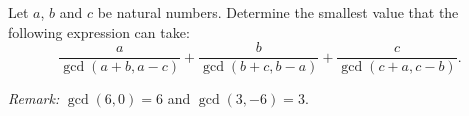 Let $a$, $b$ and $c$ be natural numbers.
Determine the smallest value that the following expression can take:
$$\frac{a}{\gcd(a+b,a-c)}+\frac{b}{\gcd(b+c,b-a)}+\frac{c}{\gcd(c+a,c-b)}.$$

\textit{Remark:} $\gcd(6,0)=6$ and $\gcd(3,-6)=3$.
